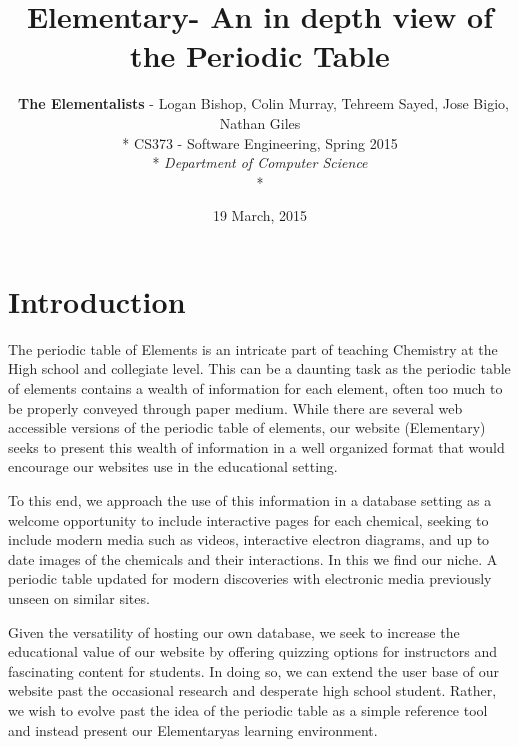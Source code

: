 \documentclass[11pt,letterpaper,onecolumn]{article}
\def \webTitle{Elementary}
\begin{document}
\title{\vspace{-3.0cm}\bf \webTitle - An in depth view of the Periodic Table}
\author{\
{\bf The Elementalists} - Logan Bishop, Colin Murray, Tehreem Sayed, Jose Bigio, Nathan Giles \\*
CS373 - Software Engineering, Spring 2015 \\*
 {\it Department of Computer Science} \\*
}
\date{19 March, 2015}
\maketitle
\newpage

\section*{Introduction}
The periodic table of Elements is an intricate part of teaching Chemistry at the High school and collegiate level.  This can be a daunting task as the periodic table of elements contains a wealth of information for each element, often too much to be properly conveyed through paper medium.  While there are several web accessible versions of the periodic table of elements, our website (\webTitle) seeks to present this wealth of information in a well organized format that would encourage our websites use in the educational setting.

To this end, we approach the use of this information in a database setting as a welcome opportunity to include interactive pages for each chemical, seeking to include modern media such as videos, interactive electron diagrams, and up to date images of the chemicals and their interactions.  In this we find our niche.  A periodic table updated for modern discoveries with electronic media previously unseen on similar sites.

 Given the versatility of hosting our own database, we seek to increase the educational value of our website by offering quizzing options for instructors and fascinating content for students.  In doing so, we can extend the user base of our website past the occasional research and desperate high school student. Rather, we wish to evolve past the idea of the periodic table as a simple reference tool and instead present our \webTitle as learning environment.   
\end{document}

